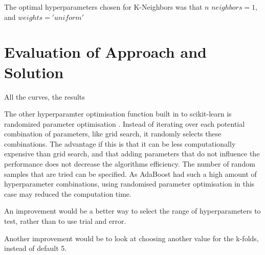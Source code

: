 \documentclass{article}
\begin{document}
The optimal hyperparameters chosen for K-Neighbors was that $n$ \textunderscore $neighbors = 1,$ and $weights = 'uniform'$


\section{Evaluation of Approach and Solution} 
	All the curves, the results


	The other hyperparamter optimisation function built in to  scikit-learn is randomized parameter optimisation \cite{gridsearch}. Instead of iterating over each potential combination of parameters, like grid search, it randomly selects these combinations. The advantage if this is that it can be less computationally expensive than grid search, and that adding parameters that do not influence the performance does not decrease the algorithms efficiency. The number of random samples that are tried can be specified.  As AdaBoost had such a high amount of hyperparameter combinations, using randomised parameter optimisation in this case may reduced the computation time. 

	An improvement would be a better way to select the range of hyperparameters to test, rather than to use trial and error.

	Another improvement would be to look at choosing another value for the k-folds, instead of default 5. 



\end{document}
